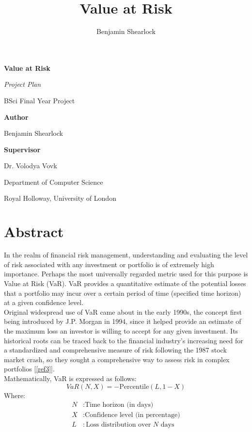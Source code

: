 \documentclass{article}
\title{Value at Risk}
\author{Benjamin Shearlock}
\begin{document}
\begin{titlepage}
  \begin{center}
    \vspace*{1cm}
    {\LARGE \textbf{Value at Risk} \par} 
    \vspace{1.5cm}
    {\Large \textit{Project Plan} \par}
    \vspace{0.5cm}
    {\Large BSci Final Year Project \par}
    \vspace{2cm}
    {\large \textbf{Author} \par}
    {\large Benjamin Shearlock \par}
    \vspace{2cm}
    {\large \textbf{Supervisor} \par}
    {\large Dr. Volodya Vovk \par}
    \vfill
    {\large Department of Computer Science \par}
    {\large Royal Holloway, University of London \par}
  \end{center}
\end{titlepage}


\section{Abstract}
In the realm of financial risk management, understanding and evaluating the level of risk associated with any investment or portfolio is of extremely high importance. Perhaps the most universally regarded metric used for this purpose is Value at Risk (VaR). VaR provides a quantitative estimate of the potential losses that a portfolio may incur over a certain period of time (specified time horizon) at a given confidence level. \\

Original widespread use of VaR came about in the early 1990s, the concept first being introduced by J.P. Morgan in 1994, since it helped provide an estimate of the maximum loss an investor is willing to accept for any given investment. Its historical roots can be traced back to the financial industry's increasing need for a standardized and comprehensive measure of risk following the 1987 stock market crash, so they sought a comprehensive way to assess risk in complex portfolios [\ref{ref3}]. \\

Mathematically, VaR is expressed as follows:
\begin{equation}
VaR(N, X) = -\text{Percentile}(L, 1 - X)
\end{equation}
Where:
\begin{align*}
N & : \text{Time horizon (in days)} \\
X & : \text{Confidence level (in percentage)} \\
L & : \text{Loss distribution over } N \text{ days}
\end{align*}
\end{document}
